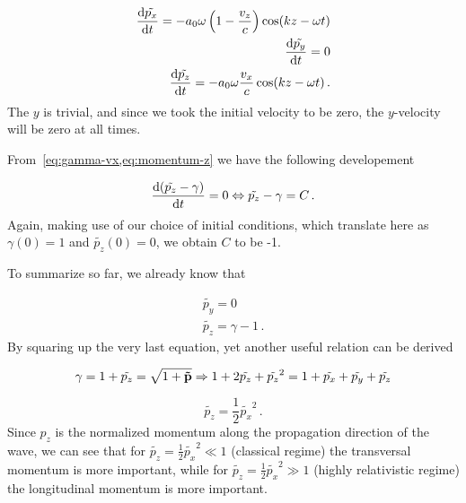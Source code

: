 \documentclass[12pt, class=report, crop=false]{standalone}
\begin{document}
\begin{subequations}
  \begin{flalign}
    \label{eq:momentum-x}
    \dv{\tilde{p_x}}{t} = -a_0 \omega \left(1 - \frac{v_z}{c} \right) \cos(kz-\omega t) \\
    \dv{\tilde{p_y}}{t} = 0 \\
    \label{eq:momentum-z}
    \dv{\tilde{p_z}}{t} = -a_0 \omega \frac{v_x}{c} \cos(kz-\omega t)\,.
  \end{flalign}
\end{subequations}
The \(y\) is trivial, and since we took the initial velocity to be zero, the \(y\)-velocity will be zero at all times.

From~\cref{eq:gamma-vx,eq:momentum-z} we have the following developement

\begin{equation}
  \dv{(\tilde{p_z}-\gamma)}{t} = 0 \Leftrightarrow \tilde{p_z}-\gamma = C \,.
\end{equation}
Again, making use of our choice of initial conditions, which translate here as \(\gamma (0) = 1\) and \(\tilde{p_z} (0)= 0\), we obtain \(C\) to be -1.

To summarize so far, we already know that

\begin{subequations}
  \begin{align}
    \tilde{p_y} = 0\\
    \label{sol:pz2}
    \tilde{p_z} = \gamma - 1\,.
  \end{align}
\end{subequations}
By squaring up the very last equation, yet another useful relation can be derived

\begin{equation*}
  \gamma = 1 + \tilde{p_z} = \sqrt{1+\vb{\tilde{p}}} \Rightarrow 1+2\tilde{p_z}+ \tilde{p_z}^2 = 1+\tilde{p_x}+\tilde{p_y}+\tilde{p_z}
\end{equation*}

\begin{equation}
  \label{sol:pz}
  \tilde{p_z} =  \frac{1}{2} \tilde{p_x}^2\,.
\end{equation}
Since \(p_z\) is the normalized momentum along the propagation direction of the wave, we can see that for \(\tilde{p_z} =  \frac{1}{2} \tilde{p_x}^2 \ll 1\) (classical regime) the transversal momentum is more important, while for \(\tilde{p_z} =  \frac{1}{2} \tilde{p_x}^2 \gg 1\) (highly relativistic regime) the longitudinal momentum is more important.
\end{document}
